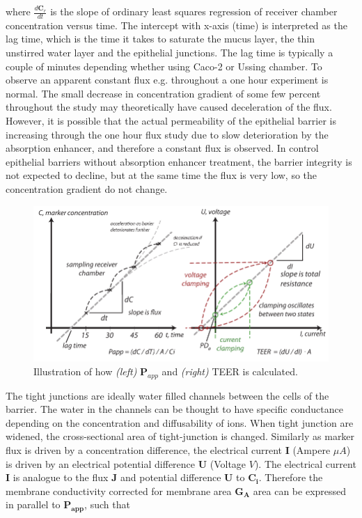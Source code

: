 where $\frac{d\bm{C}_r}{dt}$ is the slope of ordinary least squares regression of receiver chamber concentration versus time. The intercept with x-axis (time) is interpreted as the lag time, which is the time it takes to saturate the mucus layer, the thin unstirred water layer and the epithelial junctions. The lag time is typically a couple of minutes depending whether using Caco-2 or Ussing chamber. To observe an apparent constant flux e.g. throughout a one hour experiment is normal. The small decrease in concentration gradient of some few percent throughout the study may theoretically have caused deceleration of the flux. However, it is possible that the actual permeability of the epithelial barrier is increasing through the one hour flux study due to slow deterioration by the absorption enhancer, and therefore a constant flux is observed. In control epithelial barriers without absorption enhancer treatment, the barrier integrity is not expected to decline, but at the same time the flux is very low, so the concentration gradient do not change.

\begin{figure}[!htpb]
\includegraphics[width=\textwidth,height=\textheight,keepaspectratio]{graphics/samplingClamping.pdf}
\caption{Illustration of how \textit{(left)} $\bm{P}_{app}$ and \textit{(right)} TEER is calculated.}
\label{meassure_TEERPapp}
\end{figure}

The tight junctions are ideally water filled channels between the cells of the barrier. The water in the channels can be thought to have specific conductance depending on the concentration and diffusability of ions. When tight junction are widened, the cross-sectional area of tight-junction is changed. Similarly as marker flux is driven by a concentration difference, the electrical current $\bm{I}$ (Ampere $\mu A$) is driven by an electrical potential difference $\bm{U}$ (Voltage $V$). The electrical current $\bm{I}$ is analogue to the flux $\bm{J}$ and potential difference $\bm{U}$ to $\bm{C_i}$. Therefore the membrane conductivity corrected for membrane area $\bm{G_A}$ area can be expressed in parallel to $\bm{P_{app}}$, such that

